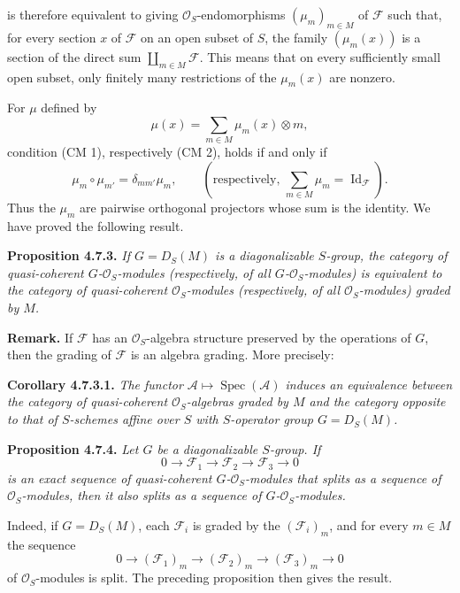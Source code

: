 is therefore equivalent to giving \(\mathcal O_S\)-endomorphisms
\((\mu_m)_{m\in M}\) of \(\mathscr F\) such that, for every section
\(x\) of \(\mathscr F\) on an open subset of \(S\), the family
\((\mu_m(x))\) is a section of the direct sum
\(\coprod_{m\in M}\mathscr F\). This means that on every sufficiently
small open subset, only finitely many restrictions of the
\(\mu_m(x)\) are nonzero.

For \(\mu\) defined by
\[
  \mu(x)=\sum_{m\in M}\mu_m(x)\otimes m,
\]
condition (CM 1), respectively (CM 2), holds if and only if
\[
  \mu_m\circ\mu_{m'}=\delta_{mm'}\mu_m,
  \qquad
  \left(\text{respectively, }\sum_{m\in M}\mu_m
    =\operatorname{Id}_{\mathscr F}\right).
\]
Thus the \(\mu_m\) are pairwise orthogonal projectors whose sum is the
identity. We have proved the following result.

\medskip
\noindent\textbf{Proposition 4.7.3.}
\textit{If \(G=D_S(M)\) is a diagonalizable \(S\)-group, the category
of quasi-coherent \(G\)-\(\mathcal O_S\)-modules (respectively, of all
\(G\)-\(\mathcal O_S\)-modules) is equivalent to the category of
quasi-coherent \(\mathcal O_S\)-modules (respectively, of all
\(\mathcal O_S\)-modules) graded by \(M\).}

\medskip
\noindent\textbf{Remark.}
If \(\mathscr F\) has an \(\mathcal O_S\)-algebra structure preserved
by the operations of \(G\), then the grading of \(\mathscr F\) is an
algebra grading. More precisely:

\medskip
\noindent\textbf{Corollary 4.7.3.1.}
\textit{The functor
\(\mathscr A\mapsto\operatorname{Spec}(\mathscr A)\) induces an
equivalence between the category of quasi-coherent
\(\mathcal O_S\)-algebras graded by \(M\) and the category opposite to
that of \(S\)-schemes affine over \(S\) with \(S\)-operator group
\(G=D_S(M)\).}

\medskip
\noindent\textbf{Proposition 4.7.4.}
\textit{Let \(G\) be a diagonalizable \(S\)-group. If
\[
  0\longrightarrow\mathscr F_1\longrightarrow\mathscr F_2
    \longrightarrow\mathscr F_3\longrightarrow0
\]
is an exact sequence of quasi-coherent \(G\)-\(\mathcal O_S\)-modules
that splits as a sequence of \(\mathcal O_S\)-modules, then it also
splits as a sequence of \(G\)-\(\mathcal O_S\)-modules.}

Indeed, if \(G=D_S(M)\), each \(\mathscr F_i\) is graded by the
\((\mathscr F_i)_m\), and for every \(m\in M\) the sequence
\[
  0\longrightarrow(\mathscr F_1)_m\longrightarrow(\mathscr F_2)_m
    \longrightarrow(\mathscr F_3)_m\longrightarrow0
\]
of \(\mathcal O_S\)-modules is split. The preceding proposition then
gives the result.

